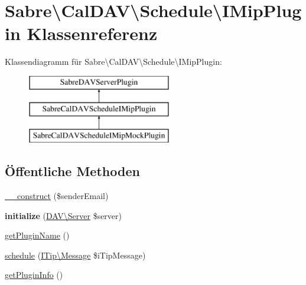 \hypertarget{class_sabre_1_1_cal_d_a_v_1_1_schedule_1_1_i_mip_plugin}{}\section{Sabre\textbackslash{}Cal\+D\+AV\textbackslash{}Schedule\textbackslash{}I\+Mip\+Plugin Klassenreferenz}
\label{class_sabre_1_1_cal_d_a_v_1_1_schedule_1_1_i_mip_plugin}
Klassendiagramm für Sabre\textbackslash{}Cal\+D\+AV\textbackslash{}Schedule\textbackslash{}I\+Mip\+Plugin\+:\begin{figure}[H]
\begin{center}
\leavevmode
\includegraphics[height=3.000000cm]{class_sabre_1_1_cal_d_a_v_1_1_schedule_1_1_i_mip_plugin}
\end{center}
\end{figure}
\subsection*{Öffentliche Methoden}
\begin{DoxyCompactItemize}
\item 
\mbox{\hyperlink{class_sabre_1_1_cal_d_a_v_1_1_schedule_1_1_i_mip_plugin_a35f25f091a1bb2ee925d52ec8dd2ffc9}{\+\_\+\+\_\+construct}} (\$sender\+Email)
\item 
\mbox{\label{class_sabre_1_1_cal_d_a_v_1_1_schedule_1_1_i_mip_plugin_afda440911d9173bcd4536e973630431f}} 
{\bfseries initialize} (\mbox{\hyperlink{class_sabre_1_1_d_a_v_1_1_server}{D\+A\+V\textbackslash{}\+Server}} \$server)
\item 
\mbox{\hyperlink{class_sabre_1_1_cal_d_a_v_1_1_schedule_1_1_i_mip_plugin_a7dfd2a619c0bbc08ab94af0d69dc144f}{get\+Plugin\+Name}} ()
\item 
\mbox{\hyperlink{class_sabre_1_1_cal_d_a_v_1_1_schedule_1_1_i_mip_plugin_a821450dc46543e2eed9b9cfaa9b9e583}{schedule}} (\mbox{\hyperlink{class_sabre_1_1_v_object_1_1_i_tip_1_1_message}{I\+Tip\textbackslash{}\+Message}} \$i\+Tip\+Message)
\item 
\mbox{\hyperlink{class_sabre_1_1_cal_d_a_v_1_1_schedule_1_1_i_mip_plugin_a6c1434da8d1841179376506c6c24d7e9}{get\+Plugin\+Info}} ()
\end{DoxyCompactItemize}
